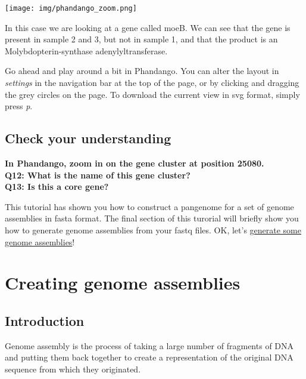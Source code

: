 \documentclass[11pt]{article}
\begin{document}
\begin{center}
\texttt{[image: img/phandango\_zoom.png]}
\end{center}


In this case we are looking at a gene called moeB. We can see that the
gene is present in sample 2 and 3, but not in sample 1, and that the
product is an Molybdopterin-synthase adenylyltransferase.

Go ahead and play around a bit in Phandango. You can alter the layout in
\textit{settings} in the navigation bar at the top of the page, or by
clicking and dragging the grey circles on the page. To download the
current view in svg format, simply press \textit{p}.

\hypertarget{check-your-understanding}{%
\subsection{Check your understanding}\label{check-your-understanding}}

\textbf{In Phandango, zoom in on the gene cluster at position 25080.}\\
\textbf{Q12: What is the name of this gene cluster?}\\
\textbf{Q13: Is this a core gene?}

This tutorial has shown you how to construct a pangenome for a set of
genome assemblies in fasta format. The final section of this turorial
will briefly show you how to generate genome assemblies from your fastq
files. OK, let's \href{assembly.ipynb}{generate some genome assemblies}!





\newpage





    \hypertarget{creating-genome-assemblies}{%
\section{Creating genome assemblies}\label{creating-genome-assemblies}}

\hypertarget{introduction}{%
\subsection{Introduction}\label{introduction}}

Genome assembly is the process of taking a large number of fragments of
DNA and putting them back together to create a representation of the
original DNA sequence from which they originated.
\end{document}
